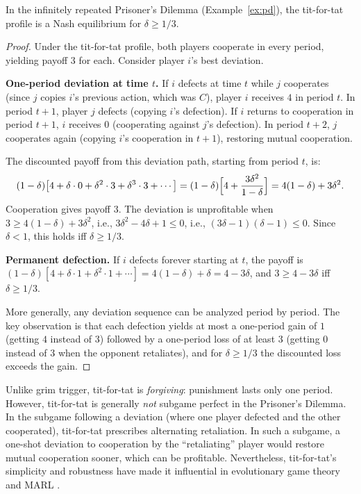 \documentclass[11pt,a4paper]{article}
\begin{document}
\begin{proposition}
\label{prop:tft-ne}
In the infinitely repeated Prisoner's Dilemma
(Example~\ref{ex:pd}), the tit-for-tat profile is a Nash equilibrium for
$\delta \geq 1/3$.
\end{proposition}

\begin{proof}
Under the tit-for-tat profile, both players cooperate in every period,
yielding payoff $3$ for each. Consider player $i$'s best deviation.

\textbf{One-period deviation at time $t$.} If $i$ defects at time $t$
while $j$ cooperates (since $j$ copies $i$'s previous action, which was
$C$), player $i$ receives $4$ in period $t$. In period $t+1$, player $j$
defects (copying $i$'s defection). If $i$ returns to cooperation in period
$t+1$, $i$ receives $0$ (cooperating against $j$'s defection). In period
$t+2$, $j$ cooperates again (copying $i$'s cooperation in $t+1$),
restoring mutual cooperation.

The discounted payoff from this deviation path, starting from period $t$,
is:
\[
    (1-\delta)\bigl[4 + \delta \cdot 0 + \delta^2 \cdot 3
    + \delta^3 \cdot 3 + \cdots\bigr]
    = (1-\delta)\Bigl[4 + \frac{3\delta^2}{1-\delta}\Bigr]
    = 4(1-\delta) + 3\delta^2.
\]
Cooperation gives payoff $3$. The deviation is unprofitable when
$3 \geq 4(1-\delta) + 3\delta^2$, i.e.,
$3\delta^2 - 4\delta + 1 \leq 0$, i.e.,
$(3\delta - 1)(\delta - 1) \leq 0$. Since $\delta < 1$, this holds iff
$\delta \geq 1/3$.

\textbf{Permanent defection.} If $i$ defects forever starting at $t$, the
payoff is $(1-\delta)[4 + \delta \cdot 1 + \delta^2 \cdot 1 + \cdots]
= 4(1-\delta) + \delta = 4 - 3\delta$, and $3 \geq 4 - 3\delta$ iff
$\delta \geq 1/3$.

More generally, any deviation sequence can be analyzed period by period.
The key observation is that each defection yields at most a one-period gain
of $1$ (getting $4$ instead of $3$) followed by a one-period loss of at
least $3$ (getting $0$ instead of $3$ when the opponent retaliates), and for
$\delta \geq 1/3$ the discounted loss exceeds the gain.
\end{proof}

\begin{remark}
Unlike grim trigger, tit-for-tat is \emph{forgiving}: punishment lasts only
one period. However, tit-for-tat is generally \emph{not} subgame perfect in
the Prisoner's Dilemma. In the subgame following a deviation (where one
player defected and the other cooperated), tit-for-tat prescribes
alternating retaliation. In such a subgame, a one-shot deviation to
cooperation by the ``retaliating'' player would restore mutual cooperation
sooner, which can be profitable. Nevertheless, tit-for-tat's simplicity and
robustness have made it influential in evolutionary game theory and MARL
\citep{shoham2008}.
\end{remark}
\end{document}
